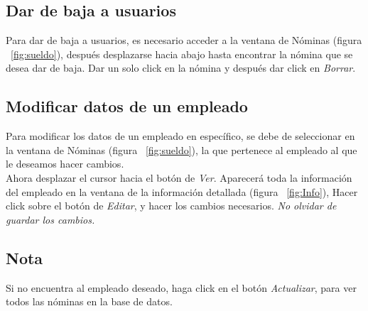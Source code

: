 \documentclass[12pt]{amsart}
\begin{document}
\subsection{Dar de baja a usuarios}
{Para dar de baja a usuarios, es necesario acceder a la ventana de N\'ominas (figura ~\ref{fig:sueldo}), despu\'es desplazarse hacia abajo hasta encontrar la n\'omina que se desea dar de baja. Dar un solo click en la n\'omina y despu\'es dar click en \textit{Borrar}.}

\subsection{Modificar datos de un empleado}
{Para modificar los datos de un empleado en espec\'ifico, se debe de seleccionar en la ventana de N\'ominas (figura ~\ref{fig:sueldo}), la que pertenece al empleado al que le deseamos hacer cambios.}\\
{Ahora desplazar el cursor hacia el bot\'on de \textit{Ver}. Aparecer\'a toda la informaci\'on del empleado en la ventana de la informaci\'on detallada (figura ~\ref{fig:Info}), Hacer click sobre el bot\'on de \textit{Editar}, y hacer los cambios necesarios. \textit{No olvidar de guardar los cambios.}}\\

\subsection{Nota}
{Si no encuentra al empleado deseado, haga click en el bot\'on \textit{Actualizar}, para ver todos las n\'ominas en la base de datos.}
\end{document}
